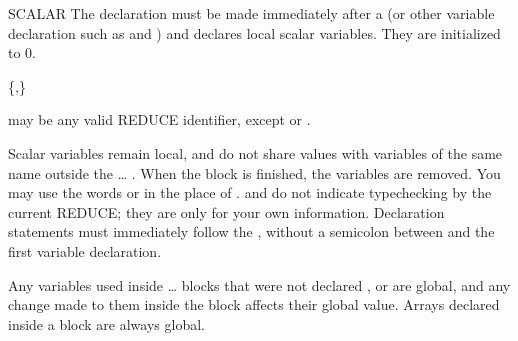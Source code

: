 \begin{Declaration}[scalar]{SCALAR}
The  declaration must be made immediately after a
 (or other variable declaration such as 
and ) and declares local scalar variables.  They are
initialized to 0.
\begin{Syntax}
 \{,\}\optional
\end{Syntax}

 may be any valid REDUCE identifier, except  or
.

\begin{Comments}
Scalar variables remain local, and do not share values with variables of
the same name outside the \ldots{} .
When the block is finished, the variables are removed.  You may use the
words  or  in the place of .
 and  do not indicate typechecking by the current
REDUCE; they are only for your own information.  Declaration statements
must immediately follow the , without a semicolon between
 and the first variable declaration.

Any variables used inside \ldots{} blocks that were not
declared ,  or  are global, and any
change made to them inside the block affects their global value.  Arrays
declared inside a block are always global.
\end{Comments}
\end{Declaration}


